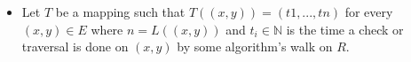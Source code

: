 \documentclass[12pt]{article}
\begin{document}
\begin{definition}
\begin{itemize}
\begin{itemize}
                \end{itemize}
            
                \item Let \begin{math}T\end{math} be a mapping such that \begin{math}T((x, y)) = (t1,...,tn)\end{math} for every \begin{math}(x, y) \in E\end{math} where \begin{math}n = L((x, y))\end{math} and \begin{math} t_{i} \in \mathbb{N}\end{math} is the time a check or traversal is done on \begin{math}(x, y)\end{math} by some algorithm’s walk on \begin{math}R\end{math}.
                    

\end{itemize}
\end{definition}
\end{document}
